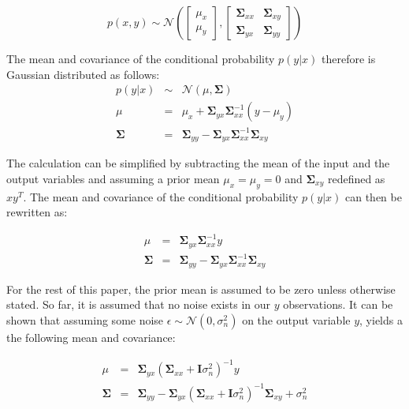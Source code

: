 \documentclass[useAMS,usenatbib,fleqn]{mn2e}
\newcommand{\bm}[1]{\mathbf{#1} }
\begin{document}
\begin{equation}
p\left ( x,y\right) \sim \mathcal{N} \left ( \begin{bmatrix}\mu_{x}\\\mu_{y} \end{bmatrix}, \begin{bmatrix}\bm{\Sigma}_{xx} & \bm{\Sigma}_{xy}\\\bm{\Sigma}_{yx} & \bm{\Sigma}_{yy} \end{bmatrix}\right )
\end{equation}

The mean and covariance of the conditional probability $p(y|x)$ therefore is Gaussian distributed as follows:
\begin{equation}
\begin{array}{rcl}
p(y|x)		&	\sim		&	\mathcal{N} \left ( \mu, \bm{\Sigma} \right )\\
\mu			&	=		&	\mu_{x}+\bm{\Sigma}_{yx}\bm{\Sigma}_{xx}^{-1}\left ( y-\mu_{y}\right )\\
\bm{\Sigma}		&	=		&	\bm{\Sigma}_{yy}-\bm{\Sigma}_{yx}\bm{\Sigma}_{xx}^{-1}\bm{\Sigma}_{xy}
\end{array}
\end{equation}

The calculation can be simplified by subtracting the mean of the input and the output variables and assuming a prior mean $\mu_{x}=\mu_{y}=0$ and $\bm{\Sigma}_{xy}$ redefined as $xy^{T}$. The mean and covariance of the conditional probability $p(y|x)$ can then be rewritten as:

\begin{equation}
\label{eq-conditional-zero-mean}
\begin{array}{rcl}
\mu 		&=&		\bm{\Sigma}_{yx}\bm{\Sigma}_{xx}^{-1}y\\
\bm{\Sigma} 	&=& 	\bm{\Sigma}_{yy}-\bm{\Sigma}_{yx}\bm{\Sigma}_{xx}^{-1}\bm{\Sigma}_{xy}
\end{array}
\end{equation}

For the rest of this paper, the prior mean is assumed to be zero unless otherwise stated. So far, it is assumed that no noise exists in our $y$ observations. It can be shown that assuming some noise $\epsilon \sim \mathcal{N}\left(0,\sigma_{n}^{2}\right)$ on the output variable $y$, yields a the following mean and covariance:

\begin{equation}
\label{eq-mean-variance-noise}
\begin{array}{rcl}
\mu &=& \bm{\Sigma}_{yx}\left(\bm{\Sigma}_{xx}+\bm{I}\sigma_{n}^{2}\right)^{-1}y\\
\bm{\Sigma} &=& \bm{\Sigma}_{yy}-\bm{\Sigma}_{yx}\left(\bm{\Sigma}_{xx}+\bm{I}\sigma_{n}^{2}\right)^{-1}\bm{\Sigma}_{xy}+\sigma_{n}^{2}
\end{array}
\end{equation}
\end{document}
